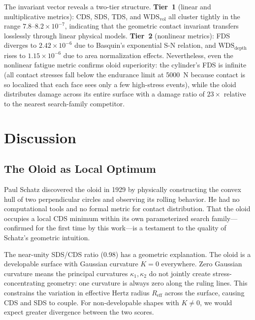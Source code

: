 \documentclass[11pt,a4paper]{article}
\begin{document}
The invariant vector reveals a two-tier structure. \textbf{Tier~1} (linear and multiplicative metrics): CDS, SDS, TDS, and $\mathrm{WDS}_{\mathrm{vol}}$ all cluster tightly in the range $7.8$--$8.2 \times 10^{-7}$, indicating that the geometric contact invariant transfers losslessly through linear physical models. \textbf{Tier~2} (nonlinear metrics): FDS diverges to $2.42 \times 10^{-6}$ due to Basquin's exponential S-N relation, and $\mathrm{WDS}_{\mathrm{depth}}$ rises to $1.15 \times 10^{-6}$ due to area normalization effects. Nevertheless, even the nonlinear fatigue metric confirms oloid superiority: the cylinder's FDS is infinite (all contact stresses fall below the endurance limit at 5000~N because contact is so localized that each face sees only a few high-stress events), while the oloid distributes damage across its entire surface with a damage ratio of $23\times$ relative to the nearest search-family competitor.


\section{Discussion}

\subsection{The Oloid as Local Optimum}

Paul Schatz discovered the oloid in 1929 by physically constructing
the convex hull of two perpendicular circles and observing its
rolling behavior. He had no computational tools and no formal metric
for contact distribution. That the oloid occupies a local CDS minimum
within its own parameterized search family---confirmed for the first
time by this work---is a testament to the quality of Schatz's
geometric intuition.

The near-unity SDS/CDS ratio (0.98) has a geometric explanation.
The oloid is a developable surface with Gaussian curvature $K = 0$
everywhere. Zero Gaussian curvature means the principal curvatures
$\kappa_1, \kappa_2$ do not jointly create stress-concentrating
geometry: one curvature is always zero along the ruling lines. This
constrains the variation in effective Hertz radius $R_{\mathrm{eff}}$
across the surface, causing CDS and SDS to couple. For non-developable
shapes with $K \neq 0$, we would expect greater divergence between
the two scores.
\end{document}
